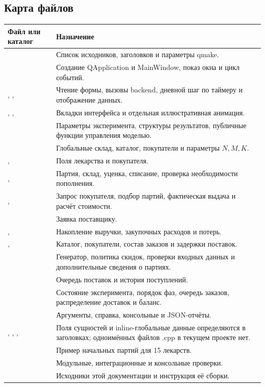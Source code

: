 \subsection{Карта файлов}
{\small
\begin{longtable}{@{}L{0.38\textwidth}L{0.55\textwidth}@{}}
\toprule
Файл или каталог & Назначение \\
\midrule
\endhead
{} & Список исходников, заголовков и параметры qmake. \\
 & Создание QApplication и MainWindow, показ окна и цикл событий. \\
, , 
& Чтение формы, вызовы backend, дневной шаг по таймеру и отображение данных. \\
, , 
& Вкладки интерфейса и отдельная иллюстративная анимация. \\
 & Параметры эксперимента, структуры результатов,
публичные функции управления моделью. \\
 & Глобальные склад, каталог, покупатели и параметры $N,M,K$. \\
,  & Поля лекарства и покупателя. \\
,  & Партия, склад, уценка, списание,
проверка необходимости пополнения. \\
,  & Запрос покупателя, подбор партий,
фактическая выдача и расчёт стоимости. \\
 & Заявка поставщику. \\
,  & Накопление выручки,
закупочных расходов и потерь. \\
,  & Каталог,
покупатели, состав заказов и задержки поставок. \\
 & Генератор, политика скидок, проверки
входных данных и дополнительные сведения о партиях. \\
 & Очередь поставок и история поступлений. \\
 & Состояние эксперимента, порядок фаз,
очередь заказов, распределение доставок и баланс. \\
 & Аргументы, справка, консольные и JSON-отчёты. \\
, , ,
 & Поля сущностей и inline-глобальные данные определяются
в заголовках; одноимённых файлов .cpp в текущем проекте нет. \\
 & Пример начальных партий для 15 лекарств. \\
 & Модульные, интеграционные и консольные проверки. \\
 & Исходники этой документации и инструкция её сборки. \\
\bottomrule
\end{longtable}
}

